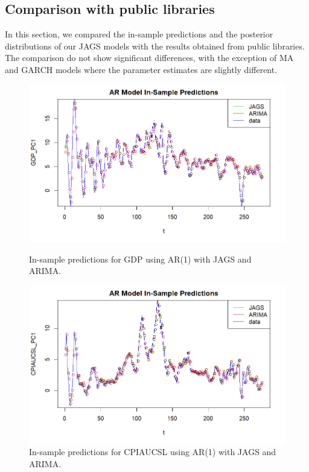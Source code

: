 \subsection*{Comparison with public libraries}
In this section, we compared the in-sample predictions and the posterior distributions of our JAGS models with the results obtained from public libraries. The comparison do not show significant differences, with the exception of MA and GARCH models where the parameter estimates are slightly different.
\begin{figure}[H]
    \centering
    \begin{minipage}{0.49\textwidth}
        \centering
        \includegraphics[width=\textwidth]{images/2-AR/ARIMA_predictions_gdp.png}
        \caption{In-sample predictions for GDP using AR(1) with JAGS and ARIMA.}
        \label{fig:ARIMA_AR_gdp_prediction}
    \end{minipage}\hfill
    \begin{minipage}{0.49\textwidth}
        \centering
        \includegraphics[width=\textwidth]{images/2-AR/ARIMA_predictions_infl.png}
        \caption{In-sample predictions for CPIAUCSL using AR(1) with JAGS and ARIMA.}
        \label{fig:ARIMA_AR_infl_prediction}
    \end{minipage}
\end{figure}
